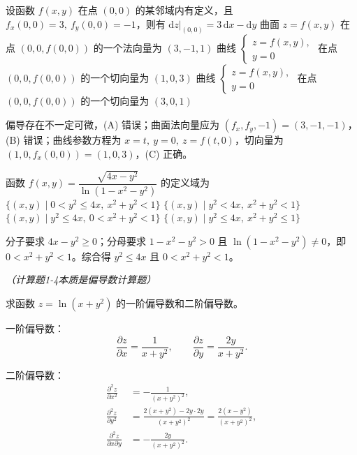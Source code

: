 \documentclass[answer]{THUExam}
\begin{document}
\begin{problem}
设函数 $f(x,y)$ 在点 $(0,0)$ 的某邻域内有定义，且 $f_x(0,0)=3,\ f_y(0,0)=-1$，则有
\options
{$\left.\mathrm{d}z\right|_{(0,0)}=3\,\mathrm{d}x-\mathrm{d}y$}
{曲面 $z=f(x,y)$ 在点 $(0,0,f(0,0))$ 的一个法向量为 $(3,-1,1)$}
{曲线 $\left\{\begin{array}{l}z=f(x,y),\\ y=0\end{array}\right.$ 在点 $(0,0,f(0,0))$ 的一个切向量为 $(1,0,3)$}
{曲线 $\left\{\begin{array}{l}z=f(x,y),\\ y=0\end{array}\right.$ 在点 $(0,0,f(0,0))$ 的一个切向量为 $(3,0,1)$}
\end{problem}
\begin{note}
偏导存在不一定可微，(A) 错误；曲面法向量应为 $(f_x,f_y,-1)=(3,-1,-1)$，(B) 错误；曲线参数方程为 $x=t,\ y=0,\ z=f(t,0)$，切向量为 $(1,0,f_x(0,0))=(1,0,3)$，(C) 正确。
\end{note}
\bigskip

\begin{problem}
函数 $f(x,y)=\dfrac{\sqrt{4x-y^2}}{\ln\left(1-x^2-y^2\right)}$ 的定义域为
\options
{$\{(x,y)\mid 0<y^2\leq 4x,\ x^2+y^2<1\}$}
{$\{(x,y)\mid y^2<4x,\ x^2+y^2<1\}$}
{$\{(x,y)\mid y^2\leq 4x,\ 0<x^2+y^2<1\}$}
{$\{(x,y)\mid y^2\leq 4x,\ x^2+y^2\leq 1\}$}
\end{problem}
\begin{note}
分子要求 $4x-y^2\geq 0$；分母要求 $1-x^2-y^2>0$ 且 $\ln(1-x^2-y^2)\neq 0$，即 $0<x^2+y^2<1$。综合得 $y^2\leq 4x$ 且 $0<x^2+y^2<1$。
\end{note}
\bigskip

\newpage
{}

\vspace{-0.3cm}
\begin{center}
\textit{（计算题1-4本质是偏导数计算题）}
\end{center}
\vspace{0.3cm}

\begin{problem}
求函数 $z=\ln\left(x+y^2\right)$ 的一阶偏导数和二阶偏导数。
\end{problem}
\begin{solution}
一阶偏导数：
\[
\frac{\partial z}{\partial x}=\frac{1}{x+y^2},\qquad
\frac{\partial z}{\partial y}=\frac{2y}{x+y^2}.
\]

二阶偏导数：
\begin{align*}
\frac{\partial^2 z}{\partial x^2}&=-\frac{1}{(x+y^2)^2},\\[4pt]
\frac{\partial^2 z}{\partial y^2}&=\frac{2(x+y^2)-2y\cdot 2y}{(x+y^2)^2}=\frac{2(x-y^2)}{(x+y^2)^2},\\[4pt]
\frac{\partial^2 z}{\partial x\partial y}&=-\frac{2y}{(x+y^2)^2}.
\end{align*}
\end{solution}
\vspace{0.5cm}
\end{document}
